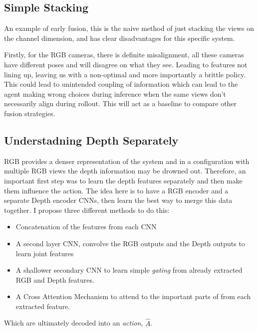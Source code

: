 \subsection{Simple Stacking}
An example of early fusion, this is the naive method of just stacking the views on the channel dimension, and has clear disadvantages for this specific system.

Firstly, for the RGB cameras, there is definite misalignment, all these cameras have different poses and will disagree on what they see. Leading to features not lining up, leaving us with a non-optimal and more importantly a brittle policy. This could lead to unintended coupling of information which can lead to the agent making wrong choices during inference when the same views don't necessarily align during rollout. This will act as a baseline to compare other fusion strategies.

\subsection{Understadning Depth Separately}\label{subsec:policies-understand-depth-sep}
RGB provides a denser representation of the system and in a configuration with multiple RGB views the depth information may be drowned out. Therefore, an important first step was to learn the depth features separately and then make them influence the action. The idea here is to have a RGB encoder and a separate Depth encoder CNNs, then learn the best way to merge this data together. I propose three different methods to do this:

\begin{itemize}
  \item Concatenation of the features from each CNN 
  \item A second layer CNN, convolve the RGB outputs and the Depth outputs to learn joint features 
  \item A shallower secondary CNN to learn simple \emph{gating} from already extracted RGB and Depth features. 
  \item A Cross Attention Mechanism to attend to the important parts of from each extracted feature.
\end{itemize}
Which are ultimately decoded into an \emph{action}, $\hat{A}$.

